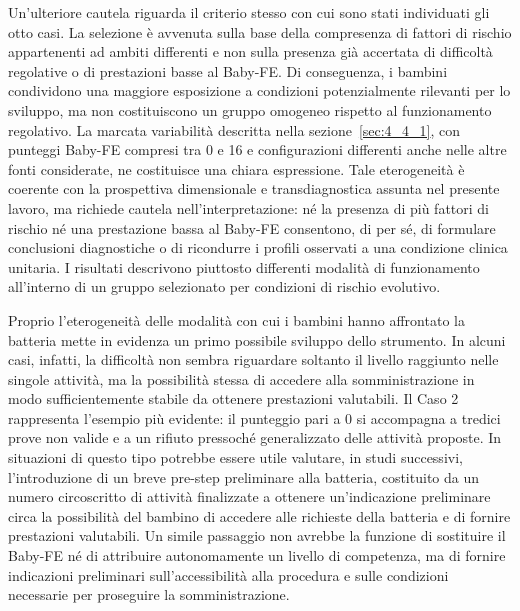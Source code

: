 Un'ulteriore cautela riguarda il criterio stesso con cui sono stati individuati gli otto casi. La selezione è avvenuta sulla base della compresenza di fattori di rischio appartenenti ad ambiti differenti e non sulla presenza già accertata di difficoltà regolative o di prestazioni basse al Baby-FE. Di conseguenza, i bambini condividono una maggiore esposizione a condizioni potenzialmente rilevanti per lo sviluppo, ma non costituiscono un gruppo omogeneo rispetto al funzionamento regolativo. La marcata variabilità descritta nella sezione~\ref{sec:4_4_1}, con punteggi Baby-FE compresi tra 0 e 16 e configurazioni differenti anche nelle altre fonti considerate, ne costituisce una chiara espressione. Tale eterogeneità è coerente con la prospettiva dimensionale e transdiagnostica assunta nel presente lavoro, ma richiede cautela nell'interpretazione: né la presenza di più fattori di rischio né una prestazione bassa al Baby-FE consentono, di per sé, di formulare conclusioni diagnostiche o di ricondurre i profili osservati a una condizione clinica unitaria. I risultati descrivono piuttosto differenti modalità di funzionamento all'interno di un gruppo selezionato per condizioni di rischio evolutivo.

Proprio l'eterogeneità delle modalità con cui i bambini hanno affrontato la batteria mette in evidenza un primo possibile sviluppo dello strumento. In alcuni casi, infatti, la difficoltà non sembra riguardare soltanto il livello raggiunto nelle singole attività, ma la possibilità stessa di accedere alla somministrazione in modo sufficientemente stabile da ottenere prestazioni valutabili. Il Caso 2 rappresenta l'esempio più evidente: il punteggio pari a 0 si accompagna a tredici prove non valide e a un rifiuto pressoché generalizzato delle attività proposte. In situazioni di questo tipo potrebbe essere utile valutare, in studi successivi, l'introduzione di un breve pre-step preliminare alla batteria, costituito da un numero circoscritto di attività finalizzate a ottenere un'indicazione preliminare circa la possibilità del bambino di accedere alle richieste della batteria e di fornire prestazioni valutabili. Un simile passaggio non avrebbe la funzione di sostituire il Baby-FE né di attribuire autonomamente un livello di competenza, ma di fornire indicazioni preliminari sull'accessibilità alla procedura e sulle condizioni necessarie per proseguire la somministrazione.

